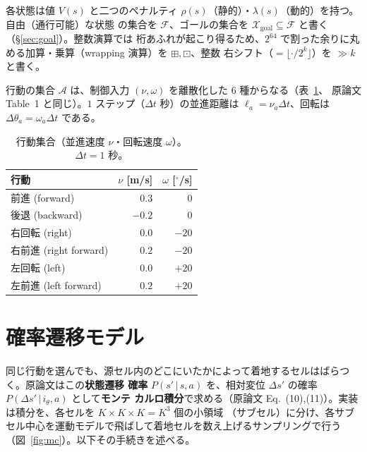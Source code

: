 \documentclass[11pt]{ltjsarticle}
\newcommand{\wadd}{\mathbin{\boxplus}}
\newcommand{\wmul}{\mathbin{\boxdot}}
\newcommand{\Xgoal}{\mathcal{X}_{\mathrm{goal}}}
\begin{document}
各状態は値 $V(s)$ と二つのペナルティ $\rho(s)$（静的）・$\lambda(s)$（動的）を持つ。自由（通行可能）な状態
の集合を $\mathcal{F}$、ゴールの集合を $\Xgoal\subseteq\mathcal{F}$ と書く（\S\ref{sec:goal}）。整数演算では
桁あふれが起こり得るため、$2^{64}$ で割った余りに丸める加算・乗算（wrapping 演算）を $\wadd,\wmul$、整数
右シフト（$=\lfloor\cdot/2^{k}\rfloor$）を $\gg k$ と書く。

行動の集合 $\mathcal{A}$ は、制御入力 $(\nu,\omega)$ を離散化した $6$ 種からなる（表~\ref{tab:actions}、
原論文 Table~1 と同じ）。$1$ ステップ（$\Delta t$ 秒）の並進距離は $\ell_a=\nu_a\Delta t$、回転は
$\Delta\theta_a=\omega_a\Delta t$ である。

\begin{table}[h]
\centering
\begin{tabular}{lrr}
\toprule
行動 & $\nu$ [m/s] & $\omega$ [$^\circ$/s] \\
\midrule
前進 (forward)        & $0.3$  & $0$   \\
後退 (backward)       & $-0.2$ & $0$   \\
右回転 (right)        & $0.0$  & $-20$ \\
右前進 (right forward)& $0.2$  & $-20$ \\
左回転 (left)         & $0.0$  & $+20$ \\
左前進 (left forward) & $0.2$  & $+20$ \\
\bottomrule
\end{tabular}
\caption{行動集合（並進速度 $\nu$・回転速度 $\omega$）。$\Delta t=1$ 秒。}
\label{tab:actions}
\end{table}

\section{確率遷移モデル}
\label{sec:trans}

同じ行動を選んでも、源セル内のどこにいたかによって着地するセルはばらつく。原論文はこの\textbf{状態遷移
確率} $P(s'\,|\,s,a)$ を、相対変位 $\Delta s'$ の確率 $P(\Delta s'\,|\,i_\theta,a)$ として\textbf{モンテ
カルロ積分}で求める（原論文 Eq.~(10),(11)）。実装は積分を、各セルを $K\times K\times K=K^3$ 個の小領域
（サブセル）に分け、各サブセル中心を運動モデルで飛ばして着地セルを数え上げるサンプリングで行う
（図~\ref{fig:mc}）。以下その手続きを述べる。
\end{document}
